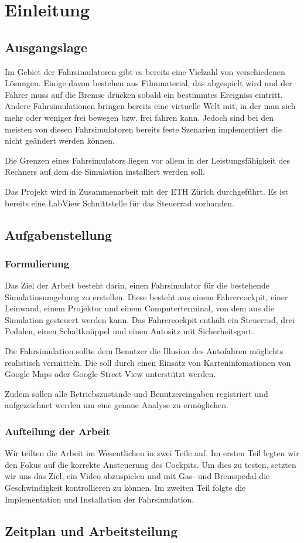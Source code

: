 \section{Einleitung}
\subsection{Ausgangslage}

Im Gebiet der Fahrsimulatoren gibt es bereits eine Vielzahl von verschiedenen Lösungen. Einige davon bestehen aus Filmmaterial, das abgespielt wird und der Fahrer muss auf die Bremse drücken sobald ein bestimmtes Ereigniss eintritt. Andere Fahrsimulationen bringen bereits eine virtuelle Welt mit, in der man sich mehr oder weniger frei bewegen bzw. frei fahren kann. Jedoch sind bei den meisten von diesen Fahrsimulatoren bereits feste Szenarien implementiert die  nicht geändert werden können.

Die Grenzen eines Fahrsimulators liegen vor allem in der Leistungsfähigkeit des Rechners auf dem die Simulation installiert werden soll. 

Das Projekt wird in Zusammenarbeit mit der ETH Zürich durchgeführt. Es ist bereits eine LabView Schnittstelle für das Steuerrad vorhanden.


\subsection{Aufgabenstellung}
\subsubsection{Formulierung}

Das Ziel der Arbeit besteht darin, einen Fahrsimulator für die bestehende Simulatinsumgebung zu erstellen. Diese besteht aus einem Fahrercockpit, einer Leinwand, einem Projektor und einem Computerterminal, von dem aus die Simulation gesteuert werden kann. Das Fahrercockpit enthält ein Steuerrad, drei Pedalen, einen Schaltknüppel und einen Autositz mit Sicherheitsgurt.

Die Fahrsimulation sollte dem Benutzer die Illusion des Autofahren möglichts realistisch vermitteln. Die soll durch einen Einsatz von Karteninfomationen von Google Maps oder Google Street View unterstützt werden. 

Zudem sollen alle Betriebszustände und Benutzereingaben registriert und aufgezeichnet werden um eine genaue Analyse zu ermöglichen. 


\subsubsection{Aufteilung der Arbeit}
Wir teilten die Arbeit im Wesentlichen in zwei Teile auf. Im ersten Teil legten wir den Fokus auf die korrekte Ansteuerung des Cockpits. Um dies zu testen, setzten wir uns das Ziel, ein Video abzuspielen und mit Gas- und Bremspedal die Geschwindigkeit kontrollieren zu können. Im zweiten Teil folgte die Implementation und Installation der Fahrsimulation.

\subsection{Zeitplan und Arbeitsteilung}